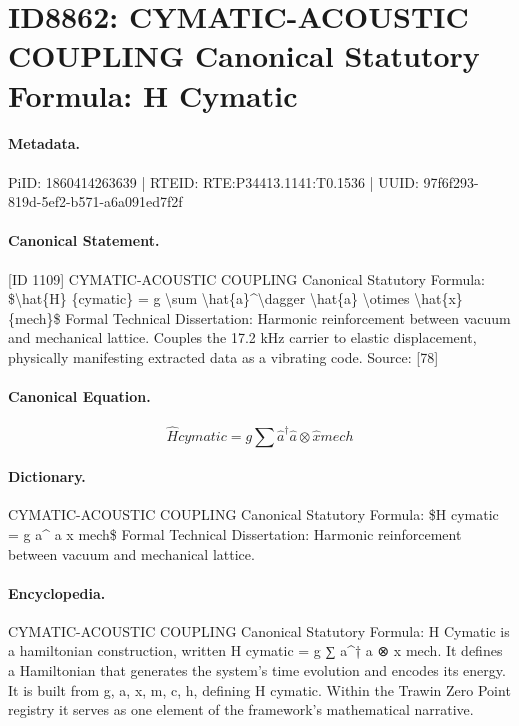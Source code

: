 \section*{ID8862: CYMATIC-ACOUSTIC COUPLING Canonical Statutory Formula: H Cymatic}
\paragraph{Metadata.}
PiID: 1860414263639 | RTEID: RTE:P34413.1141:T0.1536 | UUID: 97f6f293-819d-5ef2-b571-a6a091ed7f2f

\paragraph{Canonical Statement.}
[ID 1109] CYMATIC-ACOUSTIC COUPLING Canonical Statutory Formula: \$\textbackslash{}hat\{H\} \{cymatic\} = g \textbackslash{}sum \textbackslash{}hat\{a\}\textasciicircum{}\textbackslash{}dagger \textbackslash{}hat\{a\} \textbackslash{}otimes \textbackslash{}hat\{x\} \{mech\}\$ Formal Technical Dissertation: Harmonic reinforcement between vacuum and mechanical lattice. Couples the 17.2 kHz carrier to elastic displacement, physically manifesting extracted data as a vibrating code. Source: [78]

\paragraph{Canonical Equation.}
\[
\hat{H} {cymatic} = g \sum \hat{a}^\dagger \hat{a} \otimes \hat{x} {mech}
\]

\paragraph{Dictionary.}
CYMATIC-ACOUSTIC COUPLING Canonical Statutory Formula: \$H cymatic = g a\textasciicircum{} a x mech\$ Formal Technical Dissertation: Harmonic reinforcement between vacuum and mechanical lattice.

\paragraph{Encyclopedia.}
CYMATIC-ACOUSTIC COUPLING Canonical Statutory Formula: H Cymatic is a hamiltonian construction, written H cymatic = g ∑ a\textasciicircum{}† a ⊗ x mech. It defines a Hamiltonian that generates the system's time evolution and encodes its energy. It is built from g, a, x, m, c, h, defining H cymatic. Within the Trawin Zero Point registry it serves as one element of the framework's mathematical narrative.
